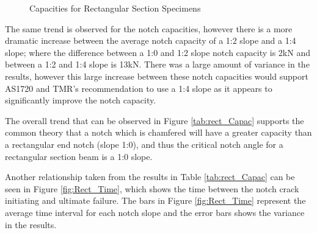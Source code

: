 \documentclass[11pt,a4paper]{article}
\numberwithin{equation}{subsection}
\begin{document}
\vspace*{\baselineskip}

\begin{figure}[h]
	\begin{center}
	\end{center}
	\caption{Capacities for Rectangular Section Specimens}
	\label{fig:Rect_Spec_Cap}
\end{figure}

\noindent
The same trend is observed for the notch capacities, however there is a more dramatic increase between the average notch capacity of a 1:2 slope and a 1:4 slope; where the difference between a 1:0 and 1:2 slope notch capacity is 2kN and between a 1:2 and 1:4 slope is 13kN. There was a large amount of variance in the results, however this large increase between these notch capacities would support AS1720 and TMR's recommendation to use a 1:4 slope as it appears to significantly improve the notch capacity.

\vspace*{\baselineskip}

\noindent
The overall trend that can be observed in Figure \ref{tab:rect_Capac} supports the common theory that a notch which is chamfered will have a greater capacity than a rectangular end notch (slope 1:0), and thus the critical notch angle for a rectangular section beam is a 1:0 slope.

\vspace*{\baselineskip}

\noindent
Another relationship taken from the results in Table \ref{tab:rect_Capac} can be seen in Figure \ref{fig:Rect_Time}, which shows the time between the notch crack initiating and ultimate failure. The bars in Figure \ref{fig:Rect_Time} represent the average time interval for each notch slope and the error bars shows the variance in the results.  
\end{document}
